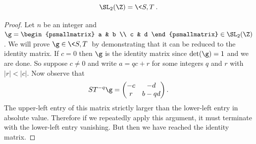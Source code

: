 \documentclass[12pt]{article}
\begin{document}
      \begin{proposition}\label{prop:PSL_generator}
          \[
            \SL_{2}(\Z) = \<S,T\>.
          \]
      \end{proposition}
      \begin{proof}
        Let \(n\) be an integer and \(\g = \begin{psmallmatrix} a & b \\ c & d \end{psmallmatrix} \in \SL_{2}(\Z)\). We will prove \(\g \in \<S,T\>\) by demonstrating that it can be reduced to the identity matrix. If \(c = 0\) then \(\g\) is the identity matrix since \(\det(\g) = 1\) and we are done. So suppose \(c \neq 0\) and write \(a = qc+r\) for some integers \(q\) and \(r\) with \(|r| < |c|\). Now observe that
        \[
          ST^{-q}\g = \begin{pmatrix} -c & -d \\ r & b-qd \end{pmatrix}.
        \]
        The upper-left entry of this matrix strictly larger than the lower-left entry in absolute value. Therefore if we repeatedly apply this argument, it must terminate with the lower-left entry vanishing. But then we have reached the identity matrix.
      \end{proof}
      
\end{document}
